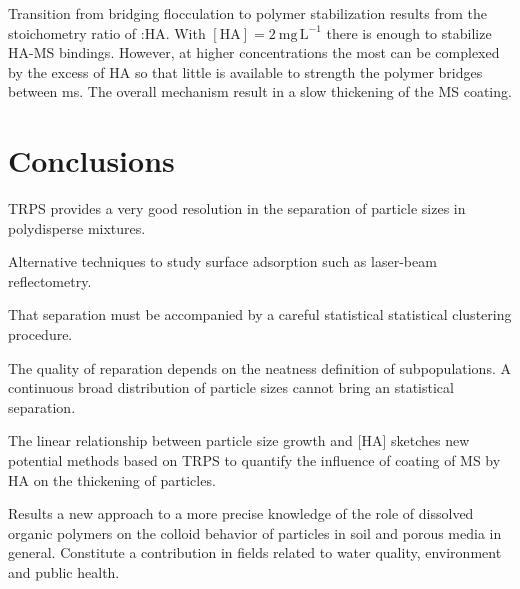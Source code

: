 \documentclass[journal=langd5,manuscript=article]{achemso}
\begin{document}
Transition from bridging flocculation to polymer stabilization results from the stoichometry ratio of 
:HA.
With 
$\mathrm{[HA]} = 2~\mathrm{mg\,L^{-1}}$ there is enough 
 to stabilize HA-MS bindings. However, at higher concentrations
the most
can be  complexed by the excess of HA  so that little
is available to strength the polymer bridges between ms.
The overall mechanism  result in a slow thickening of the MS coating. 

















 










\section{Conclusions}



TRPS provides a very good resolution in the separation  of particle sizes in polydisperse mixtures.



Alternative techniques to study surface adsorption such as laser-beam reflectometry.

That separation must be accompanied by a careful statistical statistical clustering procedure.

The quality of reparation depends on the neatness definition of subpopulations. A continuous broad distribution of particle sizes cannot bring an statistical separation.

The linear relationship  between particle size growth and [HA] sketches new potential methods based on TRPS to
quantify the influence of coating of MS by HA on the thickening of particles.

Results   a new approach to a more precise knowledge of the role of dissolved
organic polymers on the colloid behavior of particles  in soil and porous media in general. Constitute a contribution in fields related to 
water quality, environment and public health.
\end{document}
